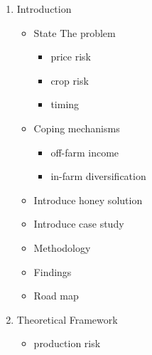 \documentclass[../main.tex]{subfiles}
\begin{document}
\begin{enumerate}
    \item Introduction
\begin{itemize}
    \item State The problem 
\begin{itemize}
    \item price risk
    \item crop risk
    \item timing
\end{itemize}

    \item Coping mechanisms
\begin{itemize}
    \item off-farm income
    \item in-farm diversification
\end{itemize}

    \item Introduce honey solution
    \item Introduce case study
    \item Methodology
    \item Findings
    \item Road map
\end{itemize}

    \item Theoretical Framework

\begin{itemize}
    \item production risk
\end{itemize}

\end{enumerate}
\end{document}
